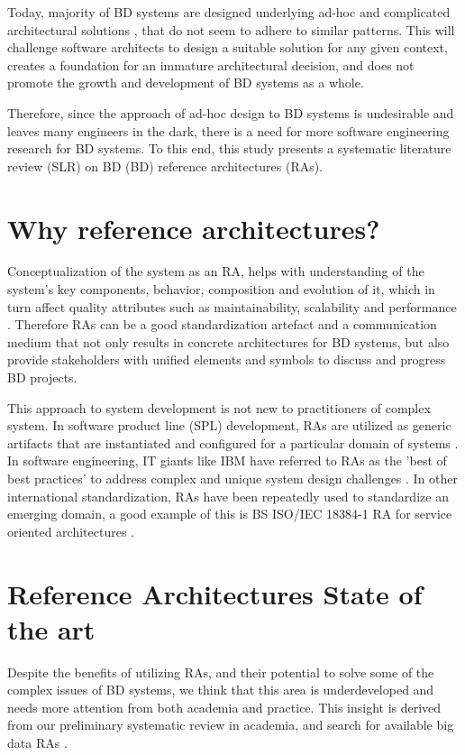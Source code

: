 \documentclass{ieeeaccess}
\begin{document}
Today, majority of BD systems are designed underlying ad-hoc and complicated architectural solutions \cite{Gorton}, that do not seem to adhere to similar patterns. This will challenge software architects to design a suitable solution for any given context, creates a foundation for an immature architectural decision, and does not promote the growth and development of BD systems as a whole. 

Therefore, since the approach of ad-hoc design to BD systems is undesirable and leaves many engineers in the dark, there is a need for more software engineering research for BD systems. To this end, this study presents a systematic literature review (SLR) on BD (BD) reference architectures (RAs). 

\section{Why reference architectures?}
Conceptualization of the system as an RA, helps with understanding of the system’s key components, behavior, composition and evolution of it, which in turn affect quality attributes such as maintainability, scalability and performance \cite{Cloutier}. Therefore RAs can be a good standardization artefact and a communication medium that not only results in concrete architectures for BD systems, but also provide stakeholders with unified elements and symbols to discuss and progress BD projects.

This approach to system development is not new to practitioners of complex system. In software product line (SPL) development, RAs are utilized as generic artifacts that are instantiated and configured for a particular domain of systems \cite{Derras}. In software engineering, IT giants like IBM have referred to RAs as the 'best of best practices' to address complex and unique system design challenges \cite{Cloutier}. In other international standardization, RAs have been repeatedly used to standardize an emerging domain, a good example of this is BS ISO/IEC 18384-1 RA for service oriented architectures \cite{Iso18384-1}. 

\section{Reference Architectures State of the art}

Despite the benefits of utilizing RAs, and their potential to solve some of the complex issues of BD systems, we think that this area is underdeveloped and needs more attention from both academia and practice. This insight is derived from our preliminary systematic review in academia, and search for available big data RAs \cite{AtaeiACIS}.
\end{document}
